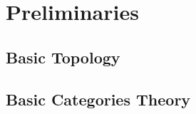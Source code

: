 \chapter{Preliminaries}

\section{Basic Topology}



\section{Basic Categories Theory}



\addtocounter{section}{1}







